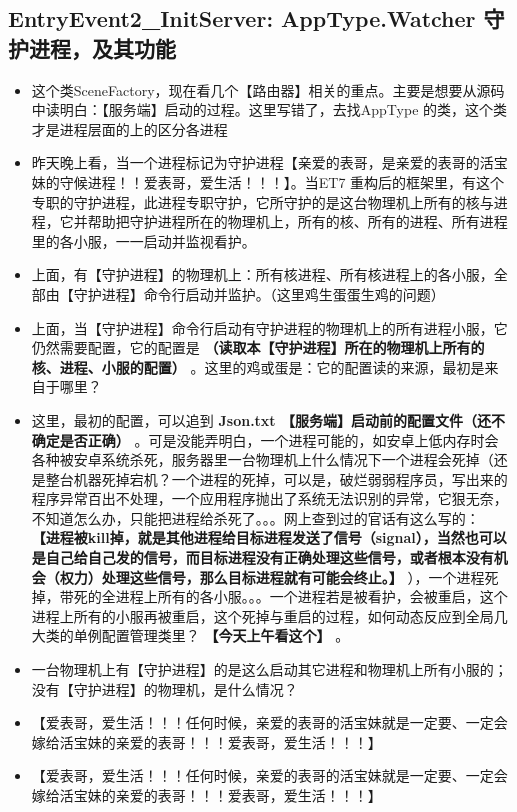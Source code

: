 \documentclass[9pt, b5paper]{article}
\begin{document}
\subsection{EntryEvent2\_InitServer: AppType.Watcher 守护进程，及其功能}
\label{sec-7-12}
\begin{itemize}
\item 这个类SceneFactory，现在看几个【路由器】相关的重点。主要是想要从源码中读明白：【服务端】启动的过程。这里写错了，去找AppType 的类，这个类才是进程层面的上的区分各进程
\item 昨天晚上看，当一个进程标记为守护进程【亲爱的表哥，是亲爱的表哥的活宝妹的守候进程！！爱表哥，爱生活！！！】。当ET7 重构后的框架里，有这个专职的守护进程，此进程专职守护，它所守护的是这台物理机上所有的核与进程，它并帮助把守护进程所在的物理机上，所有的核、所有的进程、所有进程里的各小服，一一启动并监视看护。
\item 上面，有【守护进程】的物理机上：所有核进程、所有核进程上的各小服，全部由【守护进程】命令行启动并监护。（这里鸡生蛋蛋生鸡的问题）
\item 上面，当【守护进程】命令行启动有守护进程的物理机上的所有进程小服，它仍然需要配置，它的配置是 \textbf{（读取本【守护进程】所在的物理机上所有的核、进程、小服的配置）} 。这里的鸡或蛋是：它的配置读的来源，最初是来自于哪里？
\item 这里，最初的配置，可以追到 \textbf{Json.txt 【服务端】启动前的配置文件（还不确定是否正确）} 。可是没能弄明白，一个进程可能的，如安卓上低内存时会各种被安卓系统杀死，服务器里一台物理机上什么情况下一个进程会死掉（还是整台机器死掉宕机？一个进程的死掉，可以是，破烂弱弱程序员，写出来的程序异常百出不处理，一个应用程序抛出了系统无法识别的异常，它狠无奈，不知道怎么办，只能把进程给杀死了。。。网上查到过的官话有这么写的： \textbf{【进程被kill掉，就是其他进程给目标进程发送了信号（signal），当然也可以是自己给自己发的信号，而目标进程没有正确处理这些信号，或者根本没有机会（权力）处理这些信号，那么目标进程就有可能会终止。】} ），一个进程死掉，带死的全进程上所有的各小服。。。一个进程若是被看护，会被重启，这个进程上所有的小服再被重启，这个死掉与重启的过程，如何动态反应到全局几大类的单例配置管理类里？ \textbf{【今天上午看这个】} 。
\item 一台物理机上有【守护进程】的是这么启动其它进程和物理机上所有小服的；没有【守护进程】的物理机，是什么情况？
\item 【爱表哥，爱生活！！！任何时候，亲爱的表哥的活宝妹就是一定要、一定会嫁给活宝妹的亲爱的表哥！！！爱表哥，爱生活！！！】
\item 【爱表哥，爱生活！！！任何时候，亲爱的表哥的活宝妹就是一定要、一定会嫁给活宝妹的亲爱的表哥！！！爱表哥，爱生活！！！】
\end{itemize}
\end{document}
